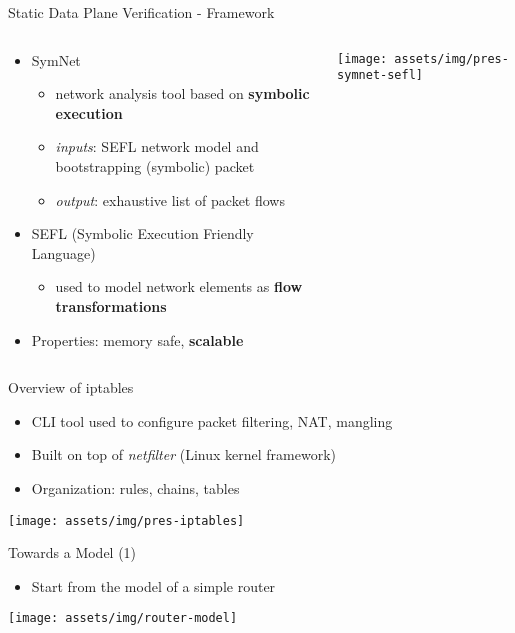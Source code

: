\documentclass{beamer}
\begin{document}
\begin{frame}{Static Data Plane Verification - Framework}
  \begin{columns}
    \begin{column}{.6\textwidth}
      \begin{itemize}
        \item SymNet
          \begin{itemize}
            \item[--] network analysis tool based on \textbf{symbolic
              execution}
            \item[--] \emph{inputs}: SEFL network model and bootstrapping
              (symbolic) packet
            \item[--] \emph{output}: exhaustive list of packet flows
          \end{itemize}
        \item SEFL (Symbolic Execution Friendly Language)
          \begin{itemize}
            \item[--] used to model network elements as \textbf{flow
              transformations}
          \end{itemize}
        \item Properties: memory safe, \textbf{scalable}
      \end{itemize}
    \end{column}

    \begin{column}{.4\textwidth}
      \centering
      \texttt{[image: assets/img/pres-symnet-sefl]}
    \end{column}
  \end{columns}
\end{frame}

\begin{frame}{Overview of iptables}
  \begin{itemize}
    \item CLI tool used to configure packet filtering, NAT, mangling
    \item Built on top of \emph{netfilter} (Linux kernel framework)
    \item Organization: rules, chains, tables
  \end{itemize}

  \centering
  \texttt{[image: assets/img/pres-iptables]}
\end{frame}

\begin{frame}[t]{Towards a Model (1)}
  \begin{itemize}
    \item[1.] Start from the model of a simple router
  \end{itemize}

  \vspace*{0.8cm}

  \centering
  \texttt{[image: assets/img/router-model]}
\end{frame}
\end{document}

